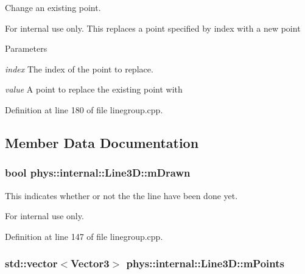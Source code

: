 Change an existing point. 

\begin{DoxyInternal}{For internal use only.}
This replaces a point specified by index with a new point 
\begin{DoxyParams}{Parameters}
\item[{\em index}]The index of the point to replace. \item[{\em value}]A point to replace the existing point with \end{DoxyParams}
\end{DoxyInternal}


Definition at line 180 of file linegroup.cpp.



\subsection{Member Data Documentation}
\hypertarget{classphys_1_1internal_1_1Line3D_a7f3a190db3c0cd83ff4fdf3d95d6f0ee}{
\subsubsection[{mDrawn}]{\setlength{\rightskip}{0pt plus 5cm}bool {\bf phys::internal::Line3D::mDrawn}}}
\label{d4/db5/classphys_1_1internal_1_1Line3D_a7f3a190db3c0cd83ff4fdf3d95d6f0ee}


This indicates whether or not the the line have been done yet. 

\begin{DoxyInternal}{For internal use only.}
\end{DoxyInternal}


Definition at line 147 of file linegroup.cpp.

\hypertarget{classphys_1_1internal_1_1Line3D_acb6b813e2d713dbad02fe5a5ca1af97e}{
\subsubsection[{mPoints}]{\setlength{\rightskip}{0pt plus 5cm}std::vector$<${\bf Vector3}$>$ {\bf phys::internal::Line3D::mPoints}}}
\label{d4/db5/classphys_1_1internal_1_1Line3D_acb6b813e2d713dbad02fe5a5ca1af97e}


